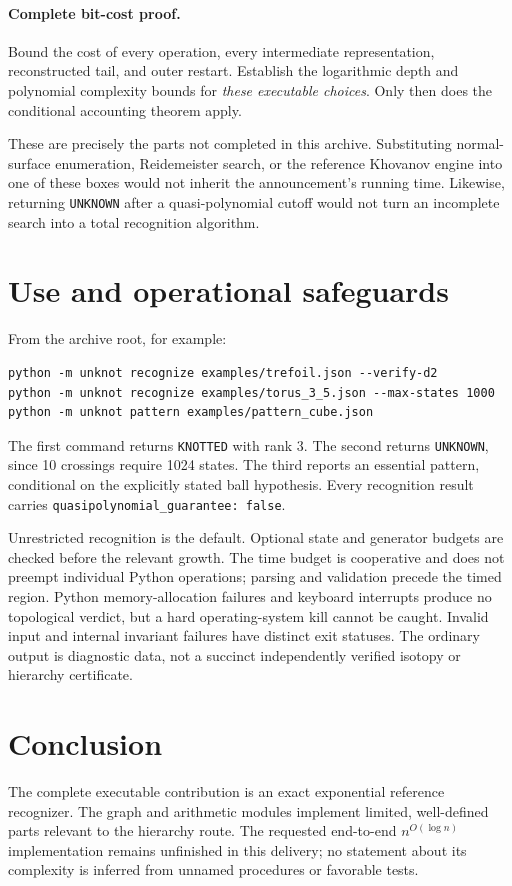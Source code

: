 \documentclass[11pt]{article}
\theoremstyle{definition}
\newcommand{\code}[1]{\texttt{#1}}
\begin{document}
\paragraph{Complete bit-cost proof.}
Bound the cost of every operation, every intermediate representation,
reconstructed tail, and outer restart. Establish the logarithmic depth and
polynomial complexity bounds for \emph{these executable choices}. Only then
does the conditional accounting theorem apply.

These are precisely the parts not completed in this archive. Substituting
normal-surface enumeration, Reidemeister search, or the reference Khovanov
engine into one of these boxes would not inherit the announcement's running
time. Likewise, returning \code{UNKNOWN} after a quasi-polynomial cutoff
would not turn an incomplete search into a total recognition algorithm.

\section{Use and operational safeguards}
From the archive root, for example:
\begin{verbatim}
python -m unknot recognize examples/trefoil.json --verify-d2
python -m unknot recognize examples/torus_3_5.json --max-states 1000
python -m unknot pattern examples/pattern_cube.json
\end{verbatim}
The first command returns \code{KNOTTED} with rank 3. The second returns
\code{UNKNOWN}, since 10 crossings require 1024 states. The third reports an
essential pattern, conditional on the explicitly stated ball hypothesis.
Every recognition result carries
\code{quasipolynomial\_guarantee: false}.

Unrestricted recognition is the default. Optional state and generator budgets
are checked before the relevant growth. The time budget is cooperative and
does not preempt individual Python operations; parsing and validation precede
the timed region. Python memory-allocation failures and keyboard interrupts
produce no topological verdict, but a hard operating-system kill cannot be
caught. Invalid input and internal invariant failures have distinct exit
statuses. The ordinary output is diagnostic data, not a succinct independently
verified isotopy or hierarchy certificate.

\section*{Conclusion}
The complete executable contribution is an exact exponential reference
recognizer. The graph and arithmetic modules implement limited, well-defined
parts relevant to the hierarchy route. The requested end-to-end
$n^{O(\log n)}$ implementation remains unfinished in this delivery; no
statement about its complexity is inferred from unnamed procedures or
favorable tests.
\end{document}
